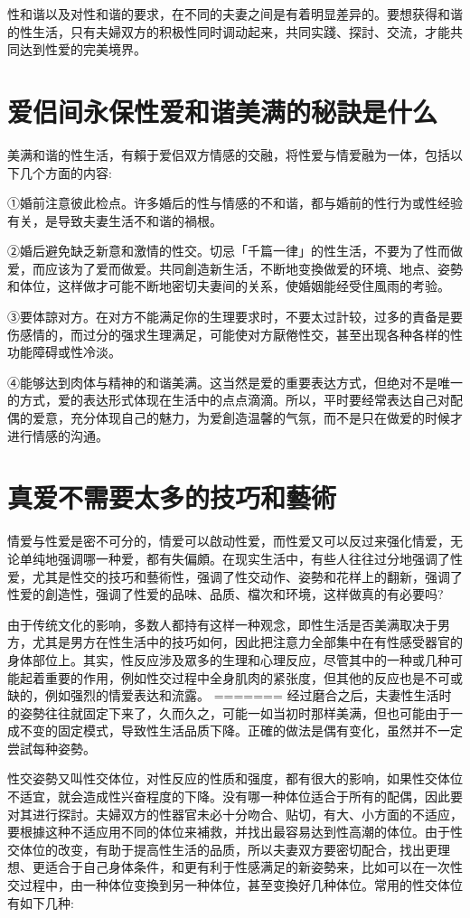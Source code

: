 \documentclass[12pt,UTF8]{ctexbook}
\begin{document}
性和谐以及对性和谐的要求，在不同的夫妻之间是有着明显差异的。要想获得和谐的性生活，只有夫婦双方的积极性同时调动起来，共同实踐、探討、交流，才能共同达到性爱的完美境界。

\section{爱侣间永保性爱和谐美满的秘訣是什么}

美满和谐的性生活，有賴于爱侣双方情感的交融，将性爱与情爱融为一体，包括以下几个方面的内容:

①婚前注意彼此检点。许多婚后的性与情感的不和谐，都与婚前的性行为或性经验有关，是导致夫妻生活不和谐的禍根。

②婚后避免缺乏新意和激情的性交。切忌「千篇一律」的性生活，不要为了性而做爱，而应该为了爱而做爱。共同創造新生活，不断地变換做爱的环境、地点、姿勢和体位，这样做才可能不断地密切夫妻间的关系，使婚姻能经受住風雨的考验。

③要体諒对方。在对方不能满足你的生理要求时，不要太过計较，过多的責备是要伤感情的，而过分的强求生理满足，可能使对方厭倦性交，甚至出现各种各样的性功能障碍或性冷淡。

④能够达到肉体与精神的和谐美满。这当然是爱的重要表达方式，但绝对不是唯一的方式，爱的表达形式体现在生活中的点点滴滴。所以，平时要经常表达自己对配偶的爱意，充分体现自己的魅力，为爱創造温馨的气氛，而不是只在做爱的时候才进行情感的沟通。

\section{真爱不需要太多的技巧和藝術}

情爱与性爱是密不可分的，情爱可以啟动性爱，而性爱又可以反过来强化情爱，无论单纯地强调哪一种爱，都有失偏頗。在现实生活中，有些人往往过分地强调了性爱，尤其是性交的技巧和藝術性，强调了性交动作、姿勢和花样上的翻新，强调了性爱的創造性，强调了性爱的品味、品质、檔次和环境，这样做真的有必要吗?

由于传统文化的影响，多数人都持有这样一种观念，即性生活是否美满取决于男方，尤其是男方在性生活中的技巧如何，因此把注意力全部集中在有性感受器官的身体部位上。其实，性反应涉及眾多的生理和心理反应，尽管其中的一种或几种可能起着重要的作用，例如性交过程中全身肌肉的紧张度，但其他的反应也是不可或缺的，例如强烈的情爱表达和流露。
=======
经过磨合之后，夫妻性生活时的姿勢往往就固定下来了，久而久之，可能一如当初时那样美满，但也可能由于一成不变的固定模式，导致性生活品质下降。正確的做法是偶有变化，虽然并不一定尝試每种姿勢。

性交姿勢又叫性交体位，对性反应的性质和强度，都有很大的影响，如果性交体位不适宜，就会造成性兴奋程度的下降。没有哪一种体位适合于所有的配偶，因此要对其进行探討。夫婦双方的性器官未必十分吻合、贴切，有大、小方面的不适应，要根據这种不适应用不同的体位来補救，并找出最容易达到性高潮的体位。由于性交体位的改变，有助于提高性生活的品质，所以夫妻双方要密切配合，找出更理想、更适合于自己身体条件，和更有利于性感满足的新姿勢来，比如可以在一次性交过程中，由一种体位变換到另一种体位，甚至变換好几种体位。常用的性交体位有如下几种:
\end{document}
